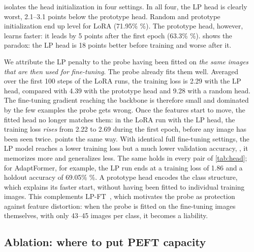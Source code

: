  isolates the head initialization in four settings.
In all four, the LP head is clearly worst, 2.1--3.1 points below the prototype head.
Random and prototype initialization end up level for LoRA (71.95\% \%).
The prototype head, however, learns faster: it leads by 5 points after the first epoch (63.3\% \%).
 shows the paradox: the LP head is 18 points better before training and worse after it.

We attribute the LP penalty to the probe having been fitted on \emph{the same images that are then used for fine-tuning}.
The probe already fits them well.
Averaged over the first 100 steps of the LoRA runs, the training loss is 2.29 with the LP head, compared with 4.39 with the prototype head and 9.28 with a random head.
The fine-tuning gradient reaching the backbone is therefore small and dominated by the few examples the probe gets wrong.
Once the features start to move, the fitted head no longer matches them: in the LoRA run with the LP head, the training loss \emph{rises} from 2.22 to 2.69 during the first epoch, before any image has been seen twice.
 points the same way.
With identical full fine-tuning settings, the LP model reaches a lower training loss but a much lower validation accuracy, \ie, it memorizes more and generalizes less.
The same holds in every pair of \cref{tab:head}; for AdaptFormer, for example, the LP run ends at a training loss of 1.86  and a holdout accuracy of 69.05\% \%.
A prototype head encodes the class structure, which explains its faster start, without having been fitted to individual training images.
This complements LP-FT~\cite{kumar2022lpft}, which motivates the probe as protection against feature distortion: when the probe is fitted on the fine-tuning images themselves, with only 43--45 images per class, it becomes a liability.

\subsection{Ablation: where to put PEFT capacity}
\label{sec:ablation-peft}

